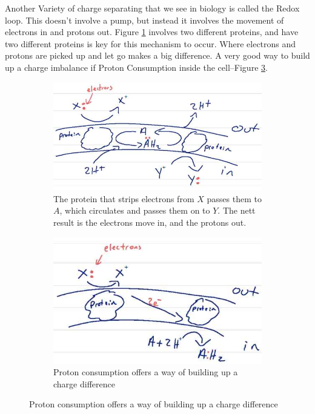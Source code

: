 \documentclass[]{article}
\begin{document}
Another Variety of charge separating that we see in biology is called the Redox loop. This doesn't involve a pump, but instead it involves the movement of electrons in and protons out. Figure \ref{fig:RedoxLoop1} involves two different proteins, and have two different proteins is key for this mechanism to occur.
Where electrons and protons are picked up and let go makes a big difference. A very good way to build up a charge imbalance if Proton Consumption inside the cell--Figure \ref{fig:ProtonConsumption}.
\begin{figure}[H]
	\caption{The Redox Loop}
	\begin{subfigure}[t]{0.45\textwidth}
		\caption{The protein that strips electrons from $X$ passes them to $A$, which circulates and passes them on to $Y$. The nett result is the electrons move in, and the protons out.}\label{fig:RedoxLoop1}
		\includegraphics[width=\textwidth]{RedoxLoop1}
	\end{subfigure}
	\begin{subfigure}[t]{0.45\textwidth}
		\caption{Proton consumption offers a way of building up a charge difference}\label{fig:ProtonConsumption}
		\includegraphics[width=\textwidth]{ProtonConsumption}

\end{subfigure}
\end{figure}
\end{document}
